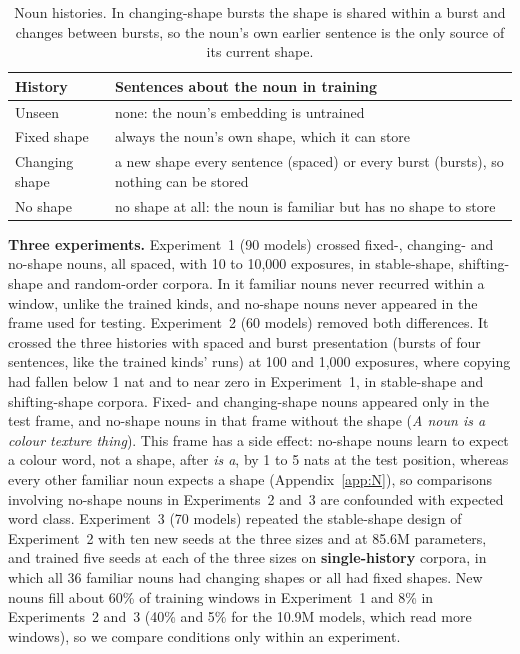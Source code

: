 \documentclass[11pt]{article}
\begin{document}
\begin{table}[t]
\centering
\small
\setlength{\tabcolsep}{3pt}
\begin{tabular}{@{}p{}p{}@{}}
\toprule
History & Sentences about the noun in training \\
\midrule
Unseen & none: the noun's embedding is untrained \\
Fixed shape & always the noun's own shape, which it can store \\
Changing shape & a new shape every sentence (spaced) or every burst (bursts), so nothing can be stored \\
No shape & no shape at all: the noun is familiar but has no shape to store \\
\bottomrule
\end{tabular}
\caption{Noun histories. In changing-shape bursts the shape is shared within a burst and changes between bursts, so the noun's own earlier sentence is the only source of its current shape.}
\label{tab:design}
\end{table}

\textbf{Three experiments.} Experiment~1 (90 models) crossed fixed-, changing- and no-shape nouns, all spaced, with 10 to 10,000 exposures, in stable-shape, shifting-shape and random-order corpora. In it familiar nouns never recurred within a window, unlike the trained kinds, and no-shape nouns never appeared in the frame used for testing. Experiment~2 (60 models) removed both differences. It crossed the three histories with spaced and burst presentation (bursts of four sentences, like the trained kinds' runs) at 100 and 1,000 exposures, where copying had fallen below 1 nat and to near zero in Experiment~1, in stable-shape and shifting-shape corpora. Fixed- and changing-shape nouns appeared only in the test frame, and no-shape nouns in that frame without the shape (\emph{A \textit{noun} is a \textit{colour} \textit{texture} thing}). This frame has a side effect: no-shape nouns learn to expect a colour word, not a shape, after \emph{is a}, by 1 to 5 nats at the test position, whereas every other familiar noun expects a shape (Appendix~\ref{app:N}), so comparisons involving no-shape nouns in Experiments~2 and~3 are confounded with expected word class. Experiment~3 (70 models) repeated the stable-shape design of Experiment~2 with ten new seeds at the three sizes and at 85.6M parameters, and trained five seeds at each of the three sizes on \textbf{single-history} corpora, in which all 36 familiar nouns had changing shapes or all had fixed shapes. New nouns fill about 60\% of training windows in Experiment~1 and 8\% in Experiments~2 and~3 (40\% and 5\% for the 10.9M models, which read more windows), so we compare conditions only within an experiment.
\end{document}
